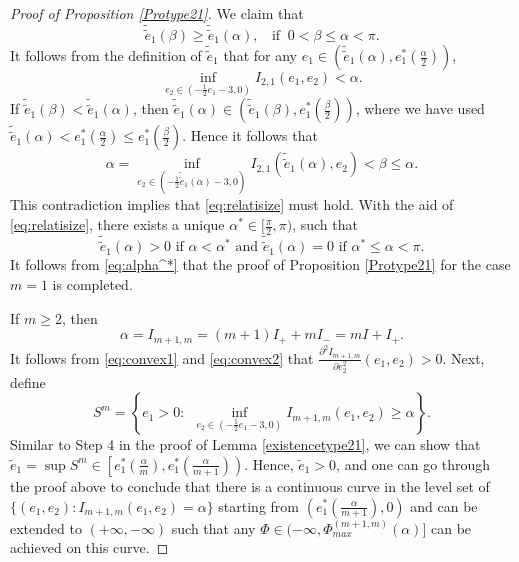 \documentclass[reqno,12pt]{amsart}
\begin{document}
{\begin{proof}[Proof of Proposition \ref{Protype21}]
    We claim that
    \begin{equation}\label{eq:relatisize}
        \tilde{\tilde{e}}_1(\beta)\geq \tilde{\tilde{e}}_1(\alpha), \ \ \ \ \mbox{if }\  0<\beta\leq \alpha< \pi.
    \end{equation}
    It follows from the definition of $ \tilde{\tilde{e}}_1$  that for any $e_1\in(\tilde{\tilde{e}}_1(\alpha), e_1^*\left(\frac{\alpha}{2}\right))$, 
    \begin{equation*}
        \inf_{e_2\in(-\frac{1}{2}e_1-3,0)}I_{2,1}(e_1,e_2)<\alpha.
    \end{equation*}
    If $\tilde{\tilde{e}}_1(\beta)< \tilde{\tilde{e}}_1(\alpha)$, then $\tilde{\tilde{e}}_1(\alpha)\in  (\tilde{\tilde{e}}_1(\beta), e_1^*\left(\frac{\beta}{2}\right))$, where we have used $\tilde{\tilde{e}}_1(\alpha)<e_1^*\left(\frac{\alpha}{2}\right)\leq e_1^*\left(\frac{\beta}{2}\right)$. Hence it follows that
    \begin{equation*}
   \alpha=\inf_{e_2\in(-\frac{1}{2}\tilde{\tilde{e}}_1(\alpha)-3,0)}I_{2,1}(\tilde{\tilde{e}}_1(\alpha),e_2)<\beta\leq \alpha.
    \end{equation*}
    This contradiction implies that \eqref{eq:relatisize} must  hold. With the aid of \eqref{eq:relatisize},  there exists a unique $\alpha^*\in [\frac{\pi}{2}, \pi)$, such that
    \begin{equation}\label{eq:alpha^*}
        \tilde{\tilde{e}}_1(\alpha)>0 \textrm{ if $\alpha<\alpha^*$ and }  \tilde{\tilde{e}}_1(\alpha)=0 \textrm{ if $\alpha^*\leq \alpha<\pi$}.  
    \end{equation}
     It follows from \eqref{eq:alpha^*} that the proof of Proposition \ref{Protype21} for the case $m=1$ is completed.
     

If $m\geq 2$, then $$\alpha=I_{m+1,m} = (m+1)I_+ + m I_- = mI + I_+.$$ 
It follows from \eqref{eq:convex1} and \eqref{eq:convex2}  that
 $\frac{\partial^2 I_{m+1, m}}{\partial e_2^2} (e_1, e_2) >0$. Next,  define 
\begin{equation*}
    S^m = \left\{ e_1>0: \ \ \inf_{e_2\in(-\frac{1}{2}e_1-3,0)}I_{m+1,m}(e_1,e_2) \geq \alpha  \right\}. 
\end{equation*}
Similar to Step 4 in the proof of Lemma \ref{existencetype21}, we can show that $\tilde{e}_1=\sup S^m \in \left[e_1^*\left(\frac{\alpha}{m}\right), e_1^*\left(\frac{\alpha}{m+1}\right)\right) $.
Hence, $\tilde{e}_1>0$, and one can go through the proof above to conclude that
there is a continuous curve in the level set of $\{(e_1,e_2): I_{m+1,m}(e_1,e_2)=\alpha\}$ starting from $(e_1^*(\frac{\alpha}{m+1}),0)$ and can be extended to $(+\infty,-\infty)$ such that
any $\Phi \in (-\infty, \Phi_{max}^{(m+1,m)}(\alpha)]$ can be achieved on this curve.
 


\end{proof}}
\end{document}
